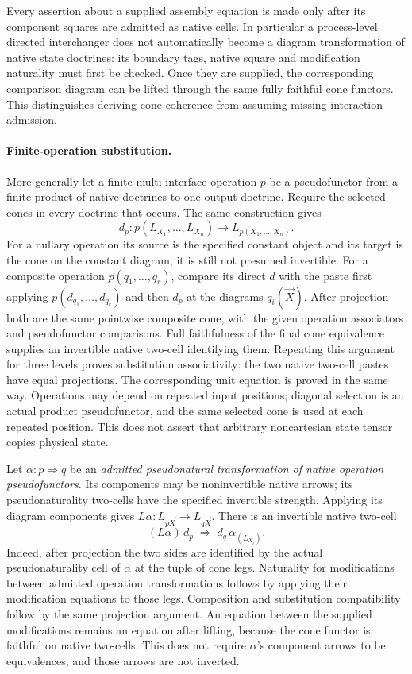 \documentclass{article}
\begin{document}
Every assertion about a supplied assembly equation is made only after its component squares are admitted as native cells. In particular a process-level directed interchanger does not automatically become a diagram transformation of native state doctrines: its boundary tags, native square and modification naturality must first be checked. Once they are supplied, the corresponding comparison diagram can be lifted through the same fully faithful cone functors. This distinguishes deriving cone coherence from assuming missing interaction admission.

\paragraph{Finite-operation substitution.} More generally let a finite multi-interface operation $p$ be a pseudofunctor from a finite product of native doctrines to one output doctrine. Require the selected cones in every doctrine that occurs. The same construction gives
\[
 d_p:p(L_{X_1},\ldots,L_{X_n})\longrightarrow L_{p(X_1,\ldots,X_n)}.
\]
For a nullary operation its source is the specified constant object and its target is the cone on the constant diagram; it is still not presumed invertible. For a composite operation $p(q_1,\ldots,q_r)$, compare its direct $d$ with the paste first applying $p(d_{q_1},\ldots,d_{q_r})$ and then $d_p$ at the diagrams $q_i(\vec X)$. After projection both are the same pointwise composite cone, with the given operation associators and pseudofunctor comparisons. Full faithfulness of the final cone equivalence supplies an invertible native two-cell identifying them. Repeating this argument for three levels proves substitution associativity: the two native two-cell pastes have equal projections. The corresponding unit equation is proved in the same way. Operations may depend on repeated input positions; diagonal selection is an actual product pseudofunctor, and the same selected cone is used at each repeated position. This does not assert that arbitrary noncartesian state tensor copies physical state.

Let $\alpha:p\Rightarrow q$ be an \emph{admitted pseudonatural transformation of native operation pseudofunctors}. Its components may be noninvertible native arrows; its pseudonaturality two-cells have the specified invertible strength. Applying its diagram components gives $L\alpha:L_{p\vec X}\to L_{q\vec X}$. There is an invertible native two-cell
\[
 (L\alpha)\,d_p\;\Longrightarrow\;d_q\,\alpha_{(L_{X_i})}.
\]
Indeed, after projection the two sides are identified by the actual pseudonaturality cell of $\alpha$ at the tuple of cone legs. Naturality for modifications between admitted operation transformations follows by applying their modification equations to those legs. Composition and substitution compatibility follow by the same projection argument. An equation between the supplied modifications remains an equation after lifting, because the cone functor is faithful on native two-cells. This does not require $\alpha$'s component arrows to be equivalences, and those arrows are not inverted.
\end{document}
